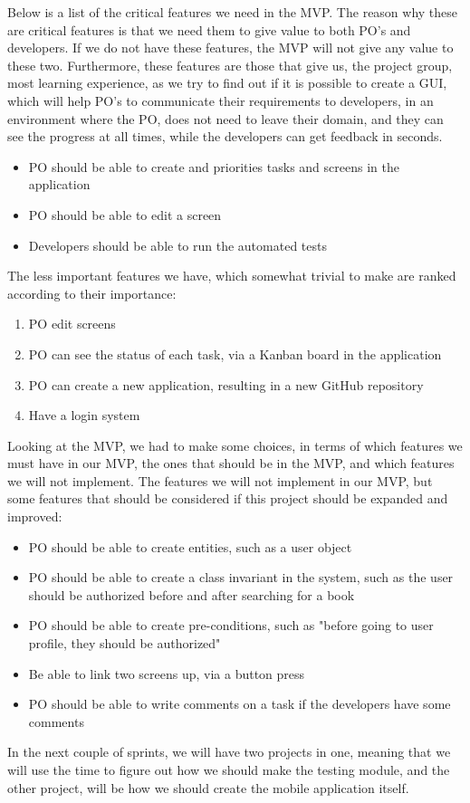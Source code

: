 Below is a list of the critical features we need in the MVP.
The reason why these are critical features is that we need them to give value to both PO's and developers.
If we do not have these features, the MVP will not give any value to these two.
Furthermore, these features are those that give us, the project group, most learning experience, as we try to find out if it is possible to create a GUI, which will help PO's to communicate their requirements to developers, in an environment where the PO, does not need to leave their domain, and they can see the progress at all times, while the developers can get feedback in seconds.

\begin{itemize}
    \item PO should be able to create and priorities tasks and screens in the application
    \item PO should be able to edit a screen
    \item Developers should be able to run the automated tests
\end{itemize}

The less important features we have, which somewhat trivial to make are ranked according to their importance:

\begin{enumerate}
    \item PO edit screens
    \item PO can see the status of each task, via a Kanban board in the application
    \item PO can create a new application, resulting in a new GitHub repository
    \item Have a login system
\end{enumerate}

Looking at the MVP, we had to make some choices, in terms of which features we must have in our MVP, the ones that should be in the MVP, and which features we will not implement.
The features we will not implement in our MVP, but some features that should be considered if this project should be expanded and improved:

\begin{itemize}
    \item PO should be able to create entities, such as a user object
    \item PO should be able to create a class invariant in the system, such as the user should be authorized before and after searching for a book
    \item PO should be able to create pre-conditions, such as "before going to user profile, they should be authorized"
    \item Be able to link two screens up, via a button press
    \item PO should be able to write comments on a task if the developers have some comments
\end{itemize}

In the next couple of sprints, we will have two projects in one, meaning that we will use the time to figure out how we should make the testing module, and the other project, will be how we should create the mobile application itself.
